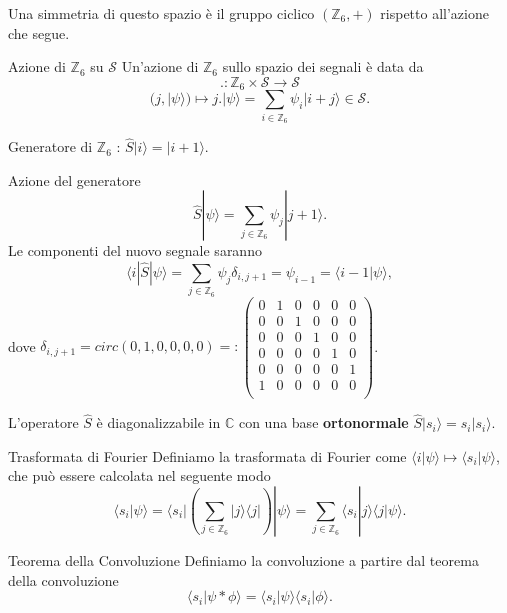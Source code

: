 \documentclass[xcolor=dvipsnames]{beamer}
\newcommand{\C}{\mathbb{C}}
\newcommand{\Z}{\mathbb{Z}}
\newcommand{\mc}[1]{\mathcal{#1}}
\begin{document}
\begin{frame}
    Una simmetria di questo spazio è il gruppo ciclico $(\Z_6,+)$ rispetto all'azione che segue.
    \begin{block}{Azione di $\Z_6$ su $\mc{S}$ }
        Un'azione di $\Z_6$ sullo spazio dei segnali è data da
        \[ . : \Z_6 \times \mc{S} \to \mc{S}\] \[ (j,| \psi \rangle) \mapsto j.| \psi \rangle = \sum_{i \in \Z_6} \psi_i | i + j \rangle \in \mc{S} .\]        
    \end{block}  
    Generatore di $\Z_6$ : $\widehat{S} | i \rangle  = | i+1 \rangle$. 
\end{frame}

\begin{frame}
    \begin{block}{Azione del generatore}
        \[ \widehat{S}| \psi \rangle = \sum_{j \in \Z_6} \psi_{j} | j + 1 \rangle.\]
        Le componenti del nuovo segnale saranno
        \[ \langle i | \widehat{S} | \psi \rangle =  \sum_{j \in \Z_6} \psi_j \delta_{i,j+1} = \psi_{i-1} = \langle i-1 | \psi \rangle, \]
        dove $ \delta_{i,j+1} = circ(0,1,0,0,0,0) =: \begin{pmatrix} 0 & 1 & 0 & 0 & 0 & 0 \\ 0 & 0 & 1 & 0 & 0 & 0 \\ 0 & 0 & 0 & 1 & 0 & 0
        \\ 0 & 0 & 0 & 0 & 1 & 0 \\ 0 & 0 & 0 & 0 & 0 & 1 \\ 1 & 0 & 0 & 0 & 0 & 0 \\ 
    \end{pmatrix} $.
    \end{block}  
    L'operatore $\widehat{S}$ è diagonalizzabile in $\C$ con una base \textbf{ortonormale} $\widehat{S}|s_i \rangle = s_i | s_i \rangle$.  
\end{frame}

\begin{frame}
    \begin{block}{Trasformata di Fourier}
        Definiamo la trasformata di Fourier come $\langle i | \psi \rangle \mapsto \langle s_i | \psi \rangle $, 
        che può essere calcolata nel seguente modo
        \[ \langle s_i | \psi \rangle = \langle s_i | \left( \sum_{j \in \Z_6} | j \rangle \langle j| \right) | \psi \rangle = 
        \sum_{j \in \Z_6} \langle s_i| j \rangle \langle j | \psi \rangle. \]
    \end{block}
    \begin{block}{Teorema della Convoluzione}
        Definiamo la convoluzione a partire dal teorema della convoluzione
        \[\langle s_i | \psi * \phi \rangle = \langle s_i | \psi \rangle \langle s_i | \phi \rangle . \]
    \end{block}
\end{frame}
\end{document}
